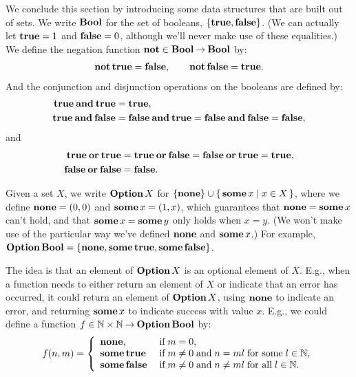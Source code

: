 %
%
We conclude this section by introducing some data structures that
are built out of sets.
We write $\mathbf{Bool}$ for the set of booleans, $\{\mathbf{true},\mathbf{false}\}$.
%
%
%
%
%
%
(We can actually let $\mathbf{true}=1$ and $\mathbf{false}=0$, although we'll
never make use of these equalities.)  We define the negation
function $\mathbf{not}\in\mathbf{Bool}\mathbin{\to}\mathbf{Bool}$ by:
\begin{gather*}
\mathbf{not}\,\mathbf{true} = \mathbf{false} , \qquad
\mathbf{not}\,\mathbf{false} = \mathbf{true} .
\end{gather*}
%
%
%
And the conjunction and disjunction operations on the booleans are
defined by:
\begin{align*}
\mathbf{true}\mathbin{\mathbf{and}}\mathbf{true} &= \mathbf{true} , \\
\mathbf{true}\mathbin{\mathbf{and}}\mathbf{false} &= \mathbf{false}\mathbin{\mathbf{and}}\mathbf{true} = \mathbf{false}\mathbin{\mathbf{and}}\mathbf{false} = \mathbf{false} ,
\end{align*}
%
%
%
and
%
%
%
%
\begin{align*}
\mathbf{true}\mathbin{\mathbf{or}}\mathbf{true} &= \mathbf{true}\mathbin{\mathbf{or}}\mathbf{false} = \mathbf{false}\mathbin{\mathbf{or}}\mathbf{true} = \mathbf{true} , \\
\mathbf{false}\mathbin{\mathbf{or}}\mathbf{false} &= \mathbf{false} .
\end{align*}

Given a set $X$, we write $\mathbf{Option}\,X$ for
%
%
%
%
%
%
%
$\{\mathbf{none}\}\cup\{ \, \mathbf{some}\,x \mid x\in X \, \}$, where we define $\mathbf{none}=(0,0)$
and $\mathbf{some}\,x=(1,x)$, which guarantees that $\mathbf{none}=\mathbf{some}\,x$ can't
hold, and that $\mathbf{some}\,x=\mathbf{some}\,y$ only holds when $x=y$.
(We won't make use of the particular way we've defined $\mathbf{none}$ and
$\mathbf{some}\,x$.)
For example, $\mathbf{Option}\,\mathbf{Bool}=\{\mathbf{none},\mathbf{some}\,\mathbf{true},\mathbf{some}\,\mathbf{false}\}$.

The idea is that an element of $\mathbf{Option}\,X$ is an optional element
of $X$.  E.g., when a function needs to either return an element of $X$
or indicate that an error has occurred, it could return an
element of $\mathbf{Option}\,X$, using $\mathbf{none}$ to indicate an error,
and returning $\mathbf{some}\,x$ to indicate success with value $x$.
E.g., we could define a function
$f\in\mathbb{N}\times\mathbb{N}\mathbin{\to}\mathbf{Option}\,\mathbf{Bool}$ by:
\begin{gather*}
f(n,m) =
\left\{ \begin{array}{ll}
\mathbf{none}, & \;\allowbreak\mbox{if}\allowbreak\;m=0, \\
\mathbf{some}\,\mathbf{true} & \;\allowbreak\mbox{if}\allowbreak\;m\neq 0 \;\allowbreak\mbox{and}\allowbreak\;
n=ml \;\allowbreak\mbox{for some}\allowbreak\;l\in\mathbb{N}, \\
\mathbf{some}\,\mathbf{false} & \;\allowbreak\mbox{if}\allowbreak\;m\neq 0 \;\allowbreak\mbox{and}\allowbreak\;
n\neq ml \;\allowbreak\mbox{for all}\allowbreak\;l\in\mathbb{N} .
\end{array} \right.  
\end{gather*}

